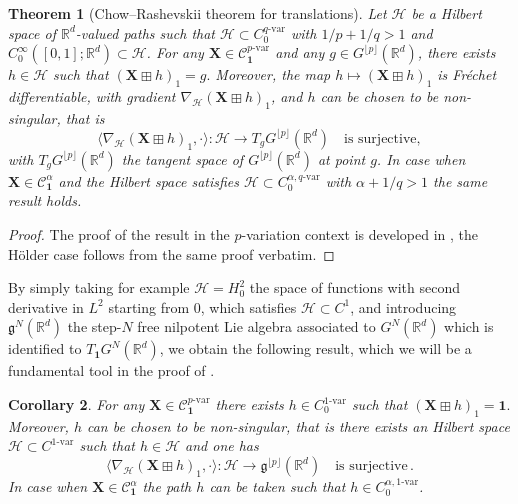\documentclass[12pt,a4paper]{article}
\numberwithin{equation}{section}
\theoremstyle{plain}
\newtheorem{theorem}{Theorem}[section]
\newtheorem{corollary}[theorem]{Corollary}
\theoremstyle{definition}
\theoremstyle{remark}
\begin{document}
\begin{theorem}[Chow--Rashevskii theorem for translations]\label{thm_chow_transl}
Let \( \mathcal{H} \) be a Hilbert space of \( \mathbb{R}^{d} \)-valued paths such that $
\mathcal{H} \subset C^{q\text{-var}}_0$ with  $1/p + 1/q > 1$ and $C^\infty_0([0,1]; \mathbb{R}^{d}) \subset \mathcal{H}$.
For any  \( \mathbf{X} \in \mathcal{C}^{p\text{-var}}_{\mathbf{1}} \) and any \( g \in G^{\lfloor p \rfloor}(\mathbb{R}^d) \), there exists \( h \in \mathcal{H} \) such that $
(\mathbf{X} \boxplus h)_1 = g.$
Moreover, the map $h \mapsto (\mathbf{X} \boxplus h)_1$ is Fr\'echet differentiable, with gradient \( \nabla_{\mathcal{H}} (\mathbf{X} \boxplus h)_1 \), and \( h \) can be chosen to be non-singular, that is
\begin{equation*}
\langle \nabla_{\mathcal{H}} (\mathbf{X} \boxplus h)_1, \cdot \rangle \colon \mathcal{H} \to T_g G^{\lfloor p \rfloor}(\mathbb{R}^d) \quad \text{is surjective},
\end{equation*}
with  $T_g G^{\lfloor p \rfloor}(\mathbb{R}^d)$ the tangent space of $G^{\lfloor p \rfloor}(\mathbb{R}^d)$ at point $g$.  In case when $ \mathbf{X}\in \mathcal{C}^{\alpha}_{\mathbf{1}} $  and the Hilbert space  satisfies $\mathcal{H}\subset C^{\alpha,q\text{-var}}_0$ with $\alpha+ 1/q>1$ the same result holds.
\end{theorem}
\begin{proof}
The proof of the result in the $p$-variation context is  developed in \cite[Theorem 5.1]{Gassiat24}, the H\"older case follows from the same proof verbatim.
\end{proof}
By simply taking for example $\mathcal{H} = H^2_0$ the space of functions with second derivative in $L^2$ starting from $0$, which satisfies $\mathcal{H}  \subset C^1$, and introducing $\mathfrak{g}^N(\mathbb{R}^d)$ the step-$N$ free nilpotent Lie algebra associated to $G^{N}(\mathbb{R}^d)$ which is identified to $T_{\mathbf{1}} G^{N}(\mathbb{R}^d)$, we obtain the following result, which we will be a fundamental tool in the proof of . 
\begin{corollary} \label{cor:fundamental_step}
For any  \( \mathbf{X} \in \mathcal{C}^{p\text{-var}}_{\mathbf{1}} \) there exists \( h \in C^{1\text{-var}}_0 \) such that $
(\mathbf{X} \boxplus h)_1 = \mathbf{1}.$
Moreover, $h$ can be chosen to be non-singular, that is there exists an Hilbert space $\mathcal{H}\subset C^{1\text{-var}}$ such that $h\in \mathcal{H}$  and one has
\begin{equation}\label{eq:non-singular}
\langle \nabla_{\mathcal{H}} (\mathbf{X} \boxplus h)_1, \cdot \rangle \colon \mathcal{H} \to\mathfrak{g}^{\lfloor p \rfloor}(\mathbb{R}^d) \quad \text{is surjective}\,.
\end{equation}
In case when $ \mathbf{X}\in \mathcal{C}^{\alpha}_{\mathbf{1}} $  the path $h$  can be taken such that $h\in  C^{\alpha, 1\text{-var}}_0$.
\end{corollary}
\end{document}
